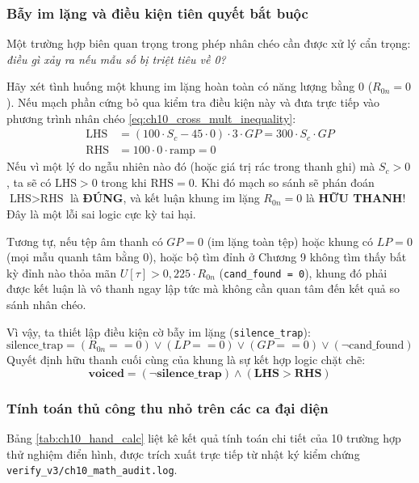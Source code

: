\subsubsection*{Bẫy im lặng và điều kiện tiên quyết bắt buộc}
Một trường hợp biên quan trọng trong phép nhân chéo cần được xử lý cẩn trọng: \emph{điều gì xảy ra nếu mẫu số bị triệt tiêu về 0?}

Hãy xét tình huống một khung im lặng hoàn toàn có năng lượng bằng 0 ($R_{0n} = 0$).
Nếu mạch phần cứng bỏ qua kiểm tra điều kiện này và đưa trực tiếp vào phương trình nhân chéo \eqref{eq:ch10_cross_mult_inequality}:
\begin{align*}
    \text{LHS} &= (100 \cdot S_c - 45 \cdot 0) \cdot 3 \cdot GP = 300 \cdot S_c \cdot GP \\
    \text{RHS} &= 100 \cdot 0 \cdot \text{ramp} = 0
\end{align*}
Nếu vì một lý do ngẫu nhiên nào đó (hoặc giá trị rác trong thanh ghi) mà $S_c > 0$, ta sẽ có $\text{LHS} > 0$ trong khi $\text{RHS} = 0$. Khi đó mạch so sánh sẽ phán đoán $\text{LHS} > \text{RHS}$ là \textbf{ĐÚNG}, và kết luận khung im lặng $R_{0n}=0$ là \textbf{HỮU THANH}! Đây là một lỗi sai logic cực kỳ tai hại.

Tương tự, nếu tệp âm thanh có $GP = 0$ (im lặng toàn tệp) hoặc khung có $LP = 0$ (mọi mẫu quanh tâm bằng 0), hoặc bộ tìm đỉnh ở Chương 9 không tìm thấy bất kỳ đỉnh nào thỏa mãn $U[\tau] > 0{,}225 \cdot R_{0n}$ (\texttt{cand\_found = 0}), khung đó phải được kết luận là vô thanh ngay lập tức mà không cần quan tâm đến kết quả so sánh nhân chéo.

Vì vậy, ta thiết lập điều kiện cờ bẫy im lặng (\texttt{silence\_trap}):
\begin{equation}
    \text{silence\_trap} = (R_{0n} == 0) \lor (LP == 0) \lor (GP == 0) \lor (\neg \text{cand\_found})
\end{equation}
Quyết định hữu thanh cuối cùng của khung là sự kết hợp logic chặt chẽ:
\begin{equation}
    \mathbf{voiced = (\neg silence\_trap) \land (LHS > RHS)}
\end{equation}

\subsubsection*{Tính toán thủ công thu nhỏ trên các ca đại diện}
Bảng \ref{tab:ch10_hand_calc} liệt kê kết quả tính toán chi tiết của 10 trường hợp thử nghiệm điển hình, được trích xuất trực tiếp từ nhật ký kiểm chứng \texttt{verify\_v3/ch10\_math\_audit.log}.

